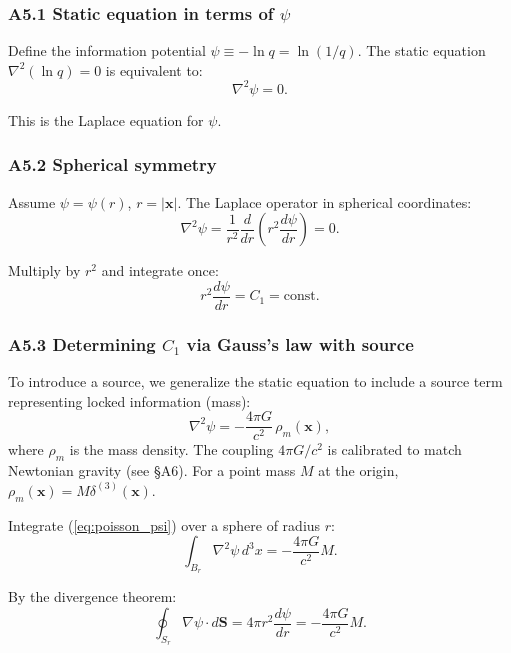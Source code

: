 \documentclass[reprint]{revtex4-2}
\begin{document}
\subsubsection{A5.1 Static equation in terms of $\psi$}

Define the information potential $\psi \equiv -\ln q = \ln(1/q)$. The static equation $\nabla^2(\ln q)=0$ is equivalent to:
\begin{equation}
\nabla^2\psi = 0.
\label{eq:static_psi}
\end{equation}

This is the Laplace equation for $\psi$.

\subsubsection{A5.2 Spherical symmetry}

Assume $\psi = \psi(r)$, $r=|\mathbf{x}|$. The Laplace operator in spherical coordinates:
\begin{equation}
\nabla^2\psi = \frac{1}{r^2}\frac{d}{dr}\left(r^2\frac{d\psi}{dr}\right) = 0.
\end{equation}

Multiply by $r^2$ and integrate once:
\begin{equation}
r^2\frac{d\psi}{dr} = C_1 = \text{const}.
\label{eq:first_integral}
\end{equation}

\subsubsection{A5.3 Determining $C_1$ via Gauss's law with source}

To introduce a source, we generalize the static equation to include a source term representing locked information (mass):
\begin{equation}
\nabla^2\psi = -\frac{4\pi G}{c^2}\,\rho_m(\mathbf{x}),
\label{eq:poisson_psi}
\end{equation}
where $\rho_m$ is the mass density. The coupling $4\pi G/c^2$ is calibrated to match Newtonian gravity (see \S A6). For a point mass $M$ at the origin, $\rho_m(\mathbf{x}) = M\delta^{(3)}(\mathbf{x})$.

Integrate (\ref{eq:poisson_psi}) over a sphere of radius $r$:
\begin{equation}
\int_{B_r} \nabla^2\psi\,d^3x = -\frac{4\pi G}{c^2}M.
\end{equation}

By the divergence theorem:
\begin{equation}
\oint_{S_r} \nabla\psi\cdot d\mathbf{S} = 4\pi r^2\frac{d\psi}{dr} = -\frac{4\pi G}{c^2}M.
\end{equation}
\end{document}
